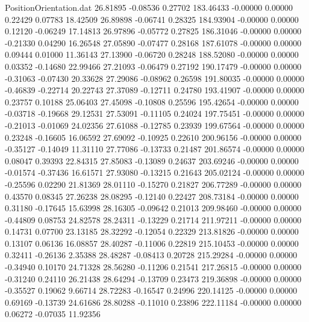 \begin{filecontents}{PositionOrientation.dat}
  26.81895   -0.08536    0.27702   183.46433   -0.00000    0.00000    0.22429    0.07783   18.42509
  26.89898   -0.06741    0.28325   184.93904   -0.00000    0.00000    0.12120   -0.06249   17.14813
  26.97896   -0.05772    0.27825   186.31046   -0.00000    0.00000   -0.21330    0.04290   16.26548
  27.05890   -0.07477    0.28168   187.61078   -0.00000    0.00000    0.09444    0.01000   11.36143
  27.13900   -0.06720    0.28248   188.52080   -0.00000    0.00000    0.03352   -0.14680   22.99466
  27.21093   -0.06479    0.27192   190.17479   -0.00000    0.00000   -0.31063   -0.07430   20.33628
  27.29086   -0.08962    0.26598   191.80035   -0.00000    0.00000   -0.46839   -0.22714   20.22743
  27.37089   -0.12711    0.24780   193.41907   -0.00000    0.00000    0.23757    0.10188   25.06403
  27.45098   -0.10808    0.25596   195.42654   -0.00000    0.00000   -0.03718   -0.19668   29.12531
  27.53091   -0.11105    0.24024   197.75451   -0.00000    0.00000   -0.21013   -0.01069   24.02356
  27.61088   -0.12785    0.23939   199.67564   -0.00000    0.00000    0.23248   -0.16605   16.06592
  27.69092   -0.10925    0.22610   200.96156   -0.00000    0.00000   -0.35127   -0.14049   11.31110
  27.77086   -0.13733    0.21487   201.86574   -0.00000    0.00000    0.08047    0.39393   22.84315
  27.85083   -0.13089    0.24637   203.69246   -0.00000    0.00000   -0.01574   -0.37436   16.61571
  27.93080   -0.13215    0.21643   205.02124   -0.00000    0.00000   -0.25596    0.02290   21.81369
  28.01110   -0.15270    0.21827   206.77289   -0.00000    0.00000    0.43570    0.08345   27.26238
  28.08295   -0.12140    0.22427   208.73184   -0.00000    0.00000    0.31180   -0.17645   15.63998
  28.16305   -0.09642    0.21013   209.98460   -0.00000    0.00000   -0.44809    0.08753   24.82578
  28.24311   -0.13229    0.21714   211.97211   -0.00000    0.00000    0.14731    0.07700   23.13185
  28.32292   -0.12054    0.22329   213.81826   -0.00000    0.00000    0.13107    0.06136   16.08857
  28.40287   -0.11006    0.22819   215.10453   -0.00000    0.00000    0.32411   -0.26136    2.35388
  28.48287   -0.08413    0.20728   215.29284   -0.00000    0.00000   -0.34940    0.10170   24.71328
  28.56280   -0.11206    0.21541   217.26815   -0.00000    0.00000   -0.31240    0.24110   26.21438
  28.64294   -0.13709    0.23473   219.36898   -0.00000    0.00000   -0.35527    0.19062    9.66714
  28.72283   -0.16547    0.24996   220.14125   -0.00000    0.00000    0.69169   -0.13739   24.61686
  28.80288   -0.11010    0.23896   222.11184   -0.00000    0.00000    0.06272   -0.07035   11.92356

\end{filecontents}
